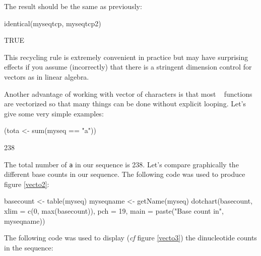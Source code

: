 \documentclass{article}
\begin{document}
\begin{enumerate}
The result should be the same as previously:

\begin{Schunk}
\begin{Sinput}
 identical(myseqtcp, myseqtcp2)
\end{Sinput}
\begin{Soutput}
[1] TRUE
\end{Soutput}
\end{Schunk}

This recycling rule is extremely convenient in practice but may have surprising
effects if you assume (incorrectly) that there is a stringent dimension control for \Rlogo{}~ vectors
as in linear algebra.

\end{enumerate}

Another advantage of working with vector of characters is that most \Rlogo{}~ functions
are vectorized so that many things can be done without explicit looping. Let's
give some very simple examples:

\begin{Schunk}
\begin{Sinput}
 (tota <- sum(myseq == "a"))
\end{Sinput}
\begin{Soutput}
[1] 238
\end{Soutput}
\end{Schunk}

The total number of \texttt{a} in our sequence is 238. Let's compare
graphically the different base counts in our sequence. The following code was used to
produce figure \ref{vecto2}:

\begin{figure}
\centering{}
\end{figure}

\begin{Schunk}
\begin{Sinput}
 basecount <- table(myseq)
 myseqname <- getName(myseq)
 dotchart(basecount, xlim = c(0, max(basecount)), pch = 19, 
     main = paste("Base count in", myseqname))
\end{Sinput}
\end{Schunk}

The following code was used to display (\textit{cf} figure \ref{vecto3}) 
the dinucleotide counts in the sequence:
\end{document}
